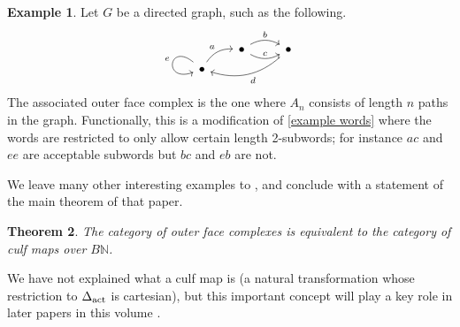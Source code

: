 \documentclass{amsart}
\newtheorem{theorem}{Theorem}[section]
\theoremstyle{definition}
\newtheorem{example}[theorem]{Example}
\newtheorem{exercise}[theorem]{Exercise}
\theoremstyle{remark}
\newcommand{\set}{\mathsf{Set}}
\newcommand{\sset}{\mathsf{sSet}}
\newcommand{\fun}{\mathsf{Fun}}
\newcommand{\op}{\textup{op}}
\newcommand{\actrm}{\textup{act}}
\newcommand{\intrm}{\textup{int}}
\newcommand{\delact}{\Delta_\actrm}
\newcommand{\delint}{\Delta_\intrm}
\DeclareMathOperator{\id}{id}
\begin{document}
\begin{example}
Let $G$ be a directed graph, such as the following.
\[ \begin{tikzcd}[row sep=tiny]
&[-0.2cm] \bullet \rar[bend left,"b"] \rar[bend right,"c"] & \bullet \ar[lld, bend left, "d"]  \\
\bullet \ar[ur, bend left,"a"] \ar[in=200, out=140, loop,"e"']
\end{tikzcd} \]
The associated outer face complex is the one where $A_n$ consists of length $n$ paths in the graph.
Functionally, this is a modification of \cref{example words} where the words are restricted to only allow certain length 2-subwords; for instance $ac$ and $ee$ are acceptable subwords but $bc$ and $eb$ are not.
\end{example}

We leave many other interesting examples to \cite{HackneyKock:FDS}, and conclude with a statement of the main theorem of that paper.

\begin{theorem}
The category of outer face complexes is equivalent to the category of culf maps over $B\mathbb{N}$.
\end{theorem}

We have not explained what a culf map is (a natural transformation whose restriction to $\delact$ is cartesian), but this important concept will play a key role in later papers in this volume \cite{CooperYoung:BIRS,Tonks:BIRS}.

\end{document}
